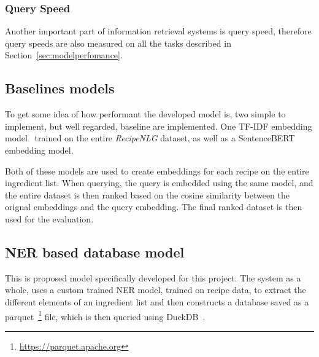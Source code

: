 \documentclass[11pt]{article}
\begin{document}
\subsubsection{Query Speed}
Another important part of information retrieval systems is query speed,
therefore query speeds are also measured on all the tasks described in
Section~\ref{sec:modelperfomance}.

\subsection{Baselines models}
To get some idea of how performant the developed model is, two simple to
implement, but well regarded, baseline are implemented.
One TF-IDF embedding model~\cite{tfidf} trained on the entire \emph{RecipeNLG}
dataset, as well as a SentenceBERT~\cite{sentence-bert} embedding model.

Both of these models are used to create embeddings for each recipe on the entire
ingredient list.
When querying, the query is embedded using the same model, and the entire
dataset is then ranked based on the cosine similarity between the orignal
embeddings and the query embedding.
The final ranked dataset is then used for the evaluation.

\subsection{NER based database model}
This is proposed model specifically developed for this project.
The system as a whole, uses a custom trained NER model, trained on recipe data,
to extract the different elements of an ingredient list and then constructs a
database saved as a parquet~\footnote{\url{https://parquet.apache.org}} file,
which is then queried using DuckDB~\cite{duckdb}.
\end{document}
